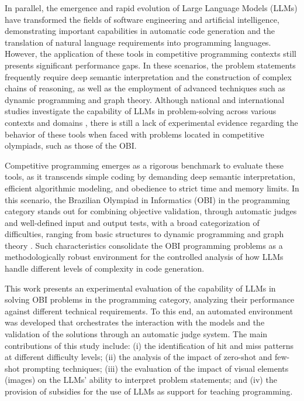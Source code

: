 \documentclass[conference]{IEEEtran}
\begin{document}
In parallel, the emergence and rapid evolution of Large Language Models (LLMs) have transformed the fields of software engineering and artificial intelligence, demonstrating important capabilities in automatic code generation and the translation of natural language requirements into programming languages. However, the application of these tools in competitive programming contexts still presents significant performance gaps. In these scenarios, the problem statements frequently require deep semantic interpretation and the construction of complex chains of reasoning, as well as the employment of advanced techniques such as dynamic programming and graph theory. Although national and international studies investigate the capability of LLMs in problem-solving across various contexts and domains \cite{chen2021evaluating, mendonca2024evaluating, viegas2025assessing, huang2024competition, zheng2025livecodebench, li2024evaluating, almeida2023bluex}, there is still a lack of experimental evidence regarding the behavior of these tools when faced with problems located in competitive olympiads, such as those of the OBI.

Competitive programming emerges as a rigorous benchmark to evaluate these tools, as it transcends simple coding by demanding deep semantic interpretation, efficient algorithmic modeling, and obedience to strict time and memory limits. In this scenario, the Brazilian Olympiad in Informatics (OBI) in the programming category stands out for combining objective validation, through automatic judges and well-defined input and output tests, with a broad categorization of difficulties, ranging from basic structures to dynamic programming and graph theory \cite{obi2026}. Such characteristics consolidate the OBI programming problems as a methodologically robust environment for the controlled analysis of how LLMs handle different levels of complexity in code generation.

This work presents an experimental evaluation of the capability of LLMs in solving OBI problems in the programming category, analyzing their performance against different technical requirements. To this end, an automated environment was developed that orchestrates the interaction with the models and the validation of the solutions through an automatic judge system. The main contributions of this study include: (i) the identification of hit and miss patterns at different difficulty levels; (ii) the analysis of the impact of zero-shot and few-shot prompting techniques; (iii) the evaluation of the impact of visual elements (images) on the LLMs' ability to interpret problem statements; and (iv) the provision of subsidies for the use of LLMs as support for teaching programming.
\end{document}
